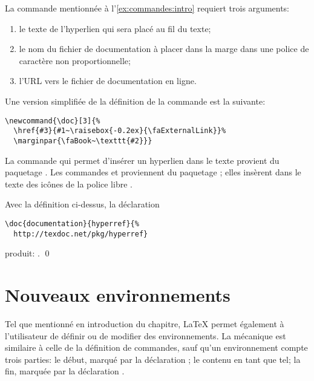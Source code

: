 \begin{exemple}
  \label{ex:commandes:doc}
  La commande \cmdprint{\doc} mentionnée à
  l'\autoref{ex:commandes:intro} requiert trois arguments:
  \begin{enumerate}
  \item le texte de l'hyperlien qui sera placé au fil du texte;
  \item le nom du fichier de documentation à placer dans la marge dans
    une police de caractère non proportionnelle;
  \item l'URL vers le fichier de documentation en ligne.
  \end{enumerate}
  Une version simplifiée de la définition de la commande est la
  suivante:
\begin{lstlisting}
\newcommand{\doc}[3]{%
  \href{#3}{#1~\raisebox{-0.2ex}{\faExternalLink}}%
  \marginpar{\faBook~\texttt{#2}}}
\end{lstlisting}
  La commande \cmd{\href} qui permet d'insérer un hyperlien dans le
  texte provient du paquetage  \citep{hyperref}. Les
  commandes \cmdprint{\faBook} et \cmdprint{\faExternalLink}
  proviennent du paquetage  \citep{fontawesome}; elles
  insèrent dans le texte des icônes de la police libre %
  . %

  Avec la définition ci-dessus, la déclaration
\begin{lstlisting}
\doc{documentation}{hyperref}{%
  http://texdoc.net/pkg/hyperref}
\end{lstlisting}
  produit: . %
  \qed
\end{exemple}


\section{Nouveaux environnements}
\label{sec:commandes:environnements}

Tel que mentionné en introduction du chapitre, {\LaTeX} permet
également à l'utilisateur de définir ou de modifier des
environnements. La mécanique est similaire à celle de la définition de
commandes, sauf qu'un environnement compte trois parties: le début,
marqué par la déclaration ; le contenu en tant que
  tel; la fin, marquée par la déclaration .

